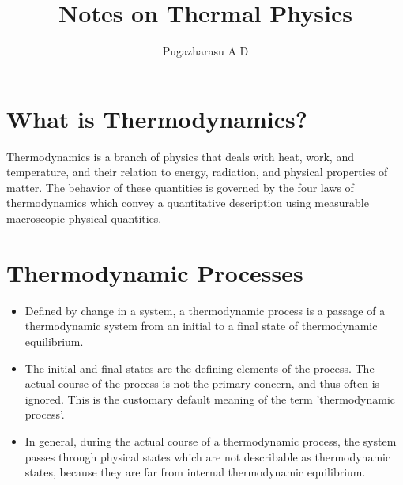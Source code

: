\documentclass[]{article}
\title{Notes on Thermal Physics}
\author{Pugazharasu A D}
\begin{document}
\maketitle



\section{What is Thermodynamics?}
Thermodynamics is a branch of physics that deals with heat, work, and temperature, and their relation to energy, radiation, and physical properties of matter. The behavior of these quantities is governed by the four laws of thermodynamics which convey a quantitative description using measurable macroscopic physical quantities.
\section{Thermodynamic Processes}
\begin{itemize}
\item Defined by change in a system, a thermodynamic process is a passage of a thermodynamic system from an initial to a final state of thermodynamic equilibrium. 
\item The initial and final states are the defining elements of the process. The actual course of the process is not the primary concern, and thus often is ignored. This is the customary default meaning of the term 'thermodynamic process'. 
\item In general, during the actual course of a thermodynamic process, the system passes through physical states which are not describable as thermodynamic states, because they are far from internal thermodynamic equilibrium.
\end{itemize}
\end{document}
